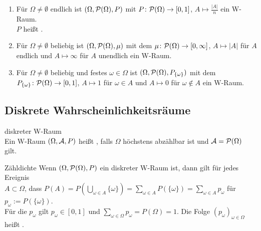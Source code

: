 \begin{Bsp}
    \begin{enumerate}
        \item
        Für $\Omega \not= \emptyset$ endlich ist $(\Omega, \P(\Omega), P)$ mit
        $P\colon \P(\Omega) \rightarrow [0, 1]$, $A \mapsto \frac{|A|}{n}$ ein W-Raum.\\
        $P$ heißt .

        \item
        Für $\Omega \not= \emptyset$ beliebig ist $(\Omega, \P(\Omega), \mu)$
        mit dem 
        $\mu\colon \P(\Omega) \rightarrow [0, \infty]$, $A \mapsto |A|$ für $A$ endlich und
        $A \mapsto \infty$ für $A$ unendlich ein W-Raum.

        \item
        Für $\Omega \not= \emptyset$ beliebig und festes $\omega \in \Omega$ ist
        $(\Omega, \P(\Omega), P_{\{\omega\}})$ mit dem \\
        $P_{\{\omega\}}\colon \P(\Omega) \rightarrow [0, 1]$,
        $A \mapsto 1$ für $\omega \in A$ und $A \mapsto 0$ für $\omega \notin A$ ein W-Raum.
    \end{enumerate}
\end{Bsp}

\subsection{%
    Diskrete Wahrscheinlichkeitsräume%
}

\begin{Def}{diskreter W-Raum}\\
    Ein W-Raum $(\Omega, \A, P)$ heißt , falls $\Omega$ höchstens abzählbar ist
    und $\A = \P(\Omega)$ gilt.
\end{Def}

\begin{Def}{Zähldichte}
    Wenn $(\Omega, \P(\Omega), P)$ ein diskreter W-Raum ist, dann gilt für jedes Ereignis\\
    $A \subset \Omega$, dass $P(A) = P(\bigcup_{\omega \in A} \{\omega\}) =
    \sum_{\omega \in A} P(\{\omega\}) = \sum_{\omega \in A} p_\omega$
    für $p_\omega := P(\{\omega\})$.\\
    Für die $p_\omega$ gilt $p_\omega \in [0, 1]$ und
    $\sum_{\omega \in \Omega} p_\omega = P(\Omega) = 1$.
    Die Folge $(p_\omega)_{\omega \in \Omega}$ heißt .
\end{Def}

